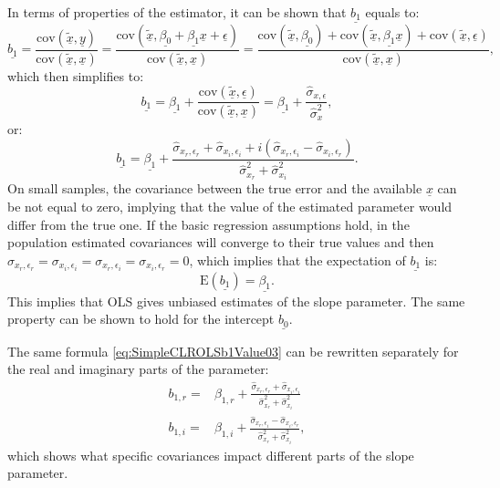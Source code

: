 \documentclass[
]{book}
\begin{document}
In terms of properties of the estimator, it can be shown that \(\underline{b_1}\) equals to:
\begin{equation}
        \underline{b_1} = \frac{\mathrm{cov}(\underline{\tilde{x}}, \underline{y})}{\mathrm{cov}(\underline{\tilde{x}},\underline{x})} = \frac{\mathrm{cov}(\underline{\tilde{x}}, \underline{\beta_0} + \underline{\beta_1} \underline{x} + \underline{\epsilon})}{\mathrm{cov}(\underline{\tilde{x}},\underline{x})} = \frac{\mathrm{cov}(\underline{\tilde{x}}, \underline{\beta_0}) + \mathrm{cov}(\underline{\tilde{x}}, \underline{\beta_1} \underline{x}) + \mathrm{cov}(\underline{\tilde{x}}, \underline{\epsilon})}{\mathrm{cov}(\underline{\tilde{x}},\underline{x})},
    \label{eq:SimpleCLROLSb1Value01}
\end{equation}
which then simplifies to:
\begin{equation}
        \underline{b_1} = \underline{\beta_1} + \frac{\mathrm{cov}(\underline{\tilde{x}}, \underline{\epsilon})}{\mathrm{cov}(\underline{\tilde{x}},\underline{x})} = \underline{\beta_1} + \frac{\hat{\sigma}_{x,\epsilon}}{\hat{\sigma}_x^2} ,
    \label{eq:SimpleCLROLSb1Value02}
\end{equation}
or:
\begin{equation}
        \underline{b_1} = \underline{\beta_1} + \frac{\hat{\sigma}_{x_r, \epsilon_r} + \hat{\sigma}_{x_i, \epsilon_i} + i (\hat{\sigma}_{x_r, \epsilon_i} - \hat{\sigma}_{x_i, \epsilon_r})}{\hat{\sigma}_{x_r}^2 + \hat{\sigma}_{x_i}^2} .
    \label{eq:SimpleCLROLSb1Value03}
\end{equation}
On small samples, the covariance between the true error and the available \(\underline{x}\) can be not equal to zero, implying that the value of the estimated parameter would differ from the true one. If the basic regression assumptions hold, in the population estimated covariances will converge to their true values and then \({\sigma}_{x_r, \epsilon_r} = {\sigma}_{x_i, \epsilon_i} = {\sigma}_{x_r, \epsilon_i} = {\sigma}_{x_i, \epsilon_r}=0\), which implies that the expectation of \(\underline{b_1}\) is:
\begin{equation}
        \mathrm{E}(\underline{b_1}) = \underline{\beta_1} .
    \label{eq:SimpleCLROLSb1Expectation}
\end{equation}
This implies that OLS gives unbiased estimates of the slope parameter. The same property can be shown to hold for the intercept \(\underline{b_0}\).

The same formula \eqref{eq:SimpleCLROLSb1Value03} can be rewritten separately for the real and imaginary parts of the parameter:
\begin{equation}
    \begin{aligned}
        b_{1,r} = & \beta_{1,r} + \frac{\hat{\sigma}_{x_r, \epsilon_r} + \hat{\sigma}_{x_i, \epsilon_i}}{\hat{\sigma}_{x_r}^2 + \hat{\sigma}_{x_i}^2} \\
        b_{1,i} = & \beta_{1,i} + \frac{\hat{\sigma}_{x_r, \epsilon_i} - \hat{\sigma}_{x_i, \epsilon_r}}{\hat{\sigma}_{x_r}^2 + \hat{\sigma}_{x_i}^2} ,
    \end{aligned}
    \label{eq:SimpleCLROLSb1Value04}
\end{equation}
which shows what specific covariances impact different parts of the slope parameter.
\end{document}
